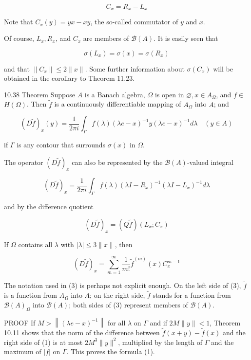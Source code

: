 \documentclass[10pt]{article}
\begin{document}
$$
C_{x}=R_{x}-L_{x}
$$

Note that $C_{x}(y)=y x-x y$, the so-called commutator of $y$ and $x$.

Of course, $L_{x}, R_{x}$, and $C_{x}$ are members of $\mathscr{B}(A)$. It is easily seen that

$$
\sigma\left(L_{x}\right)=\sigma(x)=\sigma\left(R_{x}\right)
$$

and that $\left\|C_{x}\right\| \leq 2\|x\|$. Some further information about $\sigma\left(C_{x}\right)$ will be obtained in the corollary to Theorem 11.23.

10.38 Theorem Suppose $A$ is a Banach algebra, $\Omega$ is open in $\varnothing, x \in A_{\Omega}$, and $f \in$ $H(\Omega)$. Then $\tilde{f}$ is a continuously differentiable mapping of $A_{\Omega}$ into $A$; and

$$
(D \tilde{f})_{x}(y)=\frac{1}{2 \pi i} \int_{\Gamma} f(\lambda)(\lambda e-x)^{-1} y(\lambda e-x)^{-1} d \lambda \quad(y \in A)
$$

if $\Gamma$ is any contour that surrounds $\sigma(x)$ in $\Omega$.

The operator $(D \tilde{f})_{x}$ can also be represented by the $\mathscr{B}(A)$-valued integral

$$
(D \tilde{f})_{x}=\frac{1}{2 \pi i} \int_{\Gamma} f(\lambda)\left(\lambda I-R_{x}\right)^{-1}\left(\lambda I-L_{x}\right)^{-1} d \lambda
$$

and by the difference quotient

$$
(D \tilde{f})_{x}=(Q \tilde{f})\left(L_{x} ; C_{x}\right)
$$

If $\Omega$ contains all $\lambda$ with $|\lambda| \leq 3\|x\|$, then

$$
(D \tilde{f})_{x}=\sum_{m=1}^{\infty} \frac{1}{m !} \tilde{f}^{(m)}(x) C_{x}^{m-1}
$$

The notation used in (3) is perhaps not explicit enough. On the left side of (3), $\tilde{f}$ is a function from $A_{\Omega}$ into $A$; on the right side, $\tilde{f}$ stands for a function from $\mathscr{B}(A)_{\Omega}$ into $\mathscr{B}(A)$; both sides of (3) represent members of $\mathscr{B}(A)$.

PROOF If $M>\left\|(\lambda e-x)^{-1}\right\|$ for all $\lambda$ on $\Gamma$ and if $2 M\|y\|<1$, Theorem 10.11 shows that the norm of the difference between $\tilde{f}(x+y)-\tilde{f}(x)$ and the right side of (1) is at most $2 M^{3}\|y\|^{2}$, multiplied by the length of $\Gamma$ and the maximum of $|f|$ on $\Gamma$. This proves the formula (1).
\end{document}
